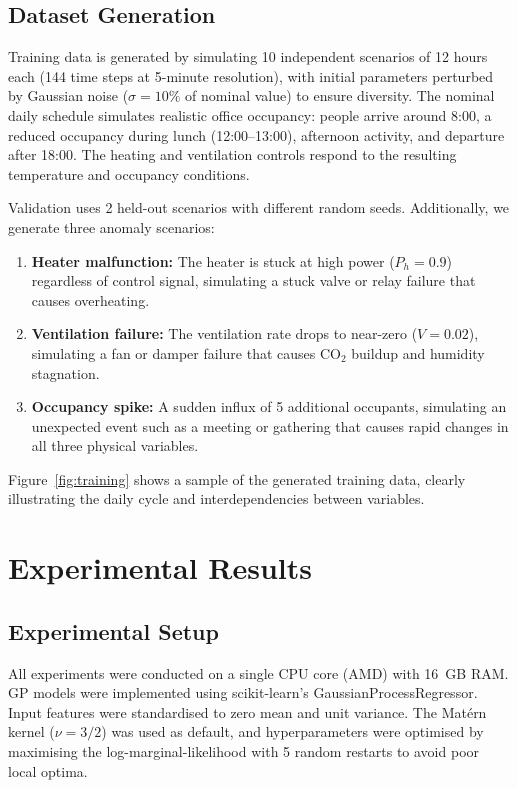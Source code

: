 \documentclass[conference]{IEEEtran}
\begin{document}
\subsection{Dataset Generation}

Training data is generated by simulating 10 independent scenarios of 12 hours each (144 time steps at 5-minute resolution), with initial parameters perturbed by Gaussian noise ($\sigma = 10\%$ of nominal value) to ensure diversity. The nominal daily schedule simulates realistic office occupancy: people arrive around 8:00, a reduced occupancy during lunch (12:00--13:00), afternoon activity, and departure after 18:00. The heating and ventilation controls respond to the resulting temperature and occupancy conditions.

Validation uses 2 held-out scenarios with different random seeds. Additionally, we generate three anomaly scenarios:

\begin{enumerate}[nosep]
\item \textbf{Heater malfunction:} The heater is stuck at high power ($P_h = 0.9$) regardless of control signal, simulating a stuck valve or relay failure that causes overheating.
\item \textbf{Ventilation failure:} The ventilation rate drops to near-zero ($V = 0.02$), simulating a fan or damper failure that causes CO$_2$ buildup and humidity stagnation.
\item \textbf{Occupancy spike:} A sudden influx of 5 additional occupants, simulating an unexpected event such as a meeting or gathering that causes rapid changes in all three physical variables.
\end{enumerate}

Figure~\ref{fig:training} shows a sample of the generated training data, clearly illustrating the daily cycle and interdependencies between variables.

\section{Experimental Results}
\label{sec:results}

\subsection{Experimental Setup}
All experiments were conducted on a single CPU core (AMD) with 16~GB RAM. GP models were implemented using scikit-learn's GaussianProcessRegressor. Input features were standardised to zero mean and unit variance. The Mat\'ern kernel ($\nu = 3/2$) was used as default, and hyperparameters were optimised by maximising the log-marginal-likelihood with 5 random restarts to avoid poor local optima.
\end{document}
